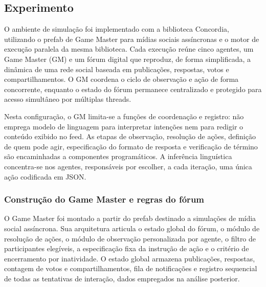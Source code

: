 
\subsection{Experimento}
\label{sec:experimento}

O ambiente de simulação foi implementado com a biblioteca Concordia, utilizando o prefab de Game Master para mídias sociais assíncronas e o motor de execução paralela da mesma biblioteca. Cada execução reúne cinco agentes, um Game Master (GM) e um fórum digital que reproduz, de forma simplificada, a dinâmica de uma rede social baseada em publicações, respostas, votos e compartilhamentos. O GM coordena o ciclo de observação e ação de forma concorrente, enquanto o estado do fórum permanece centralizado e protegido para acesso simultâneo por múltiplas threads.

Nesta configuração, o GM limita-se a funções de coordenação e registro: não emprega modelo de linguagem para interpretar intenções nem para redigir o conteúdo exibido no feed. As etapas de observação, resolução de ações, definição de quem pode agir, especificação do formato de resposta e verificação de término são encaminhadas a componentes programáticos. A inferência linguística concentra-se nos agentes, responsáveis por escolher, a cada iteração, uma única ação codificada em JSON.

\subsubsection{Construção do Game Master e regras do fórum}
\label{sec:gm-forum}

O Game Master foi montado a partir do prefab destinado a simulações de mídia social assíncrona. Sua arquitetura articula o estado global do fórum, o módulo de resolução de ações, o módulo de observação personalizada por agente, o filtro de participantes elegíveis, a especificação fixa da instrução de ação e o critério de encerramento por inatividade. O estado global armazena publicações, respostas, contagem de votos e compartilhamentos, fila de notificações e registro sequencial de todas as tentativas de interação, dados empregados na análise posterior.

